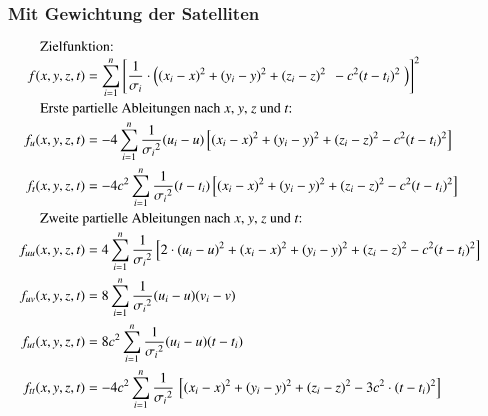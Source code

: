 \begin{refsection}
\subsubsection{Mit Gewichtung der Satelliten}
{
\parindent0pt
\begin{align*}
\noalign{Zielfunktion:}
f(x,y,z,t)
&=
\sum_{i=1}^{n}\left[\frac{1}{\sigma_i}\cdot \left((x_i-x)^2 + (y_i-y)^2 + (z_i-z)^2\;\, - c^2 (t-t_i)^2\;\right)\right]^2
\\
\noalign{Erste partielle Ableitungen nach $x$, $y$, $z$ und $t$:}
f_u(x,y,z,t)
&=
-4\sum_{i=1}^{n}\frac{1}{{\sigma_i}^2}(u_i-u)\left[(x_i - x)^2 + (y_i - y)^2 + (z_i - z)^2 - c^2(t - t_i)^2 \right]
\\
f_t(x,y,z,t)
&=
-4c^2\sum_{i=1}^{n}\frac{1}{{\sigma_i}^2}(t-t_i)\left[(x_i - x)^2 + (y_i - y)^2 + (z_i - z)^2 - c^2(t - t_i)^2\right]
\\
\noalign{Zweite partielle Ableitungen nach $x$, $y$, $z$ und $t$:}
f_{uu}(x,y,z,t)
&=
4\sum_{i=1}^{n}\frac{1}{{\sigma_i}^2}\left[2\cdot(u_i-u)^2 + (x_i - x)^2 + (y_i - y)^2 + (z_i - z)^2 - c^2(t - t_i)^2\right]
\\
f_{uv}(x,y,z,t)
&=
8\sum_{i=1}^{n}\frac{1}{{\sigma_i}^2}(u_i-u)(v_i-v)
\\
f_{ut}(x,y,z,t)
&=
8c^2\sum_{i=1}^{n}\frac{1}{{\sigma_i}^2}(u_i-u)(t-t_i)
\\
f_{tt}(x,y,z,t)
&=
-4c^2\sum_{i=1}^{n}\frac{1}{{\sigma_i}^2}\,\left[(x_i - x)^2 + (y_i - y)^2 + (z_i - z)^2 - 3c^2\cdot(t - t_i)^2\right]
\end{align*}
}

\printbibliography[heading=subbibliography]
\end{refsection}
